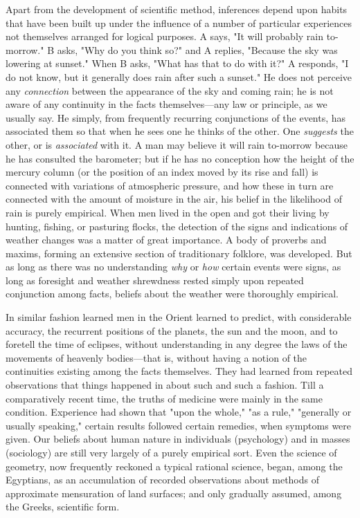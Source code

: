 \documentclass[letterpaper]{book}
\begin{document}

Apart from the development of scientific method, inferences depend upon
habits that have been built up under the influence of a number of
particular experiences not themselves arranged for logical purposes. A
says, "It will probably rain to-morrow." B asks, "Why do you think so?"
and A replies, "Because the sky was lowering at sunset." When B asks,
"What has that to do with it?" A responds, "I do not know, but it
generally does rain after such a sunset." He does not perceive any
\emph{connection} between the appearance of the sky and coming rain; he
is not aware of any continuity in the facts themselves---any law or
principle, as we usually say. He simply, from frequently recurring
conjunctions of the events, has associated them so that when he sees one
he thinks of the other. One \emph{suggests} the other, or is
\emph{associated} with it. A man may believe it will rain to-morrow
because he has consulted the barometer; but if he has no conception how
the height of the mercury column (or the position of an index moved by
its rise and fall) is connected with variations of atmospheric pressure,
and how these in turn are connected with the amount of moisture in the
air, his belief in the likelihood of rain is purely empirical. When men
lived in the open and got their living by hunting, fishing,
or
pasturing flocks, the detection of the signs and indications of weather
changes was a matter of great importance. A body of proverbs and maxims,
forming an extensive section of traditionary folklore, was developed.
But as long as there was no understanding \emph{why} or \emph{how}
certain events were signs, as long as foresight and weather shrewdness
rested simply upon repeated conjunction among facts, beliefs about the
weather were thoroughly empirical.


In similar fashion learned men in the Orient learned to predict, with
considerable accuracy, the recurrent positions of the planets, the sun
and the moon, and to foretell the time of eclipses, without
understanding in any degree the laws of the movements of heavenly
bodies---that is, without having a notion of the continuities existing
among the facts themselves. They had learned from repeated observations
that things happened in about such and such a fashion. Till a
comparatively recent time, the truths of medicine were mainly in the
same condition. Experience had shown that "upon the whole," "as a rule,"
"generally or usually speaking," certain results followed certain
remedies, when symptoms were given. Our beliefs about human nature in
individuals (psychology) and in masses (sociology) are still very
largely of a purely empirical sort. Even the science of geometry, now
frequently reckoned a typical rational science, began, among the
Egyptians, as an accumulation of recorded observations about methods of
approximate mensuration of land surfaces; and only gradually assumed,
among the Greeks, scientific form.
\end{document}
